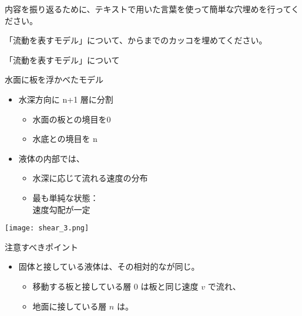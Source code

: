 \documentclass[uplatex,dvipdfmx,a4paper,11pt]{jsreport}
\begin{document}
内容を振り返るために、テキストで用いた言葉を使って簡単な穴埋めを行ってください。
\begin{qlist}
	\qitem 「流動を表すモデル」について、からまでのカッコを埋めてください。
		\vspace{5mm}
		\begin{qlist2}
			\qitem 「流動を表すモデル」について
			\begin{center}
				\begin{minipage}{0.4\textwidth}
					\begin{itembox}[l]{水面に板を浮かべたモデル}
						\begin{itemize}
							\item 水深方向に n+1 層に分割
								\begin{itemize}
									\item 水面の板との境目を0
									\item 水底との境目を n 
								\end{itemize}
								\item 液体の内部では、
								\begin{itemize}
									\item 水深に応じて流れる速度の分布
									\item 最も単純な状態：\\速度勾配が一定
								\end{itemize}
						\end{itemize}
					\end{itembox}
				\end{minipage}
				\begin{minipage}{0.45\textwidth}
					\begin{center}
					\texttt{[image: shear\_3.png]}
					\end{center}
				\end{minipage}
				\begin{minipage}{0.9\textwidth}
					\begin{center}
					\begin{itembox}[l]{注意すべきポイント}
						\begin{itemize}
							\item 固体と接している液体は、その相対的な\qbox{}が同じ。
							\begin{itemize}
								\item 移動する板と接している層 0 は板と同じ速度 $v$ で流れ、
								\item 地面に接している層 $n$ は\qbox{}。
							\end{itemize}

\end{itemize}
\end{itembox}
\end{center}
\end{minipage}
\end{center}
\end{qlist2}
\end{qlist}
\end{document}
